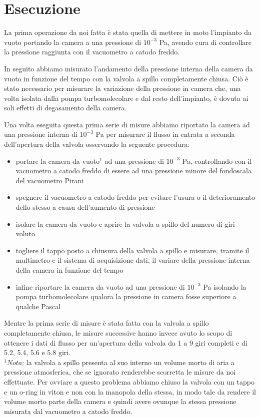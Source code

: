 \section{Esecuzione}

La prima operazione da noi fatta è stata quella di mettere in moto l'impianto da vuoto portando la camera a una pressione di $10^{-3}$ \si{\pascal}, avendo cura di controllare la pressione raggiunta con il vacuometro a catodo freddo.

In seguito abbiamo misurato l'andamento della pressione interna della camera da vuoto in funzione del tempo con la valvola a spillo completamente chiusa. Ciò è stato necessario per misurare la variazione della pressione in camera che, una volta isolata dalla pompa turbomolecolare e dal resto dell'impianto, è dovuta ai soli effetti di degasamento della camera.

Una volta eseguita questa prima serie di misure abbiamo riportato la camera ad una pressione interna di $10^{-3}$ \si{\pascal} per misurare il flusso in entrata a seconda dell'apertura della valvola osservando la seguente procedura:
\begin{itemize}
	\item{portare la camera da vuoto$^1$ ad una pressione di $10^{-3}$ \si{\pascal}, controllando con il vacuometro a catodo freddo di essere ad una pressione minore del fondoscala del vacuometro Pirani}
	\item{spegnere il vacuometro a catodo freddo per evitare l'usura o il deterioramento dello stesso a causa dell'aumento di pressione}
	\item{isolare la camera da vuoto e aprire la valvola a spillo del numero di giri voluto}
	\item{togliere il tappo posto a chiusura della valvola a spillo e misurare, tramite il multimetro e il sistema di acquisizione dati, il variare della pressione interna della camera in funzione del tempo}
	\item{infine riportare la camera da vuoto ad una pressione di $10^{-3}$ \si{\pascal} isolando la pompa turbomolecolare qualora la pressione in camera fosse superiore a qualche Pascal}
\end{itemize}
Mentre la prima serie di misure è stata fatta con la valvola a spillo completamente chiusa, le misure successive hanno invece avuto lo scopo di ottenere i dati di flusso per un'apertura della valvola da 1 a 9 giri completi e di 5.2, 5.4, 5.6 e 5.8 giri.\\

$^1 Nota$: la valvola a spillo presenta al suo interno un volume morto di aria a pressione atmosferica, che se ignorato renderebbe scorretta le misure da noi effettuate. Per ovviare a questo problema abbiamo chiuso la valvola con un tappo e un o-ring in viton e non con la manopola della stessa, in modo tale da rendere il volume morto parte della camera e quindi avere ovunque la stessa pressione misurata dal vacuometro a catodo freddo.

